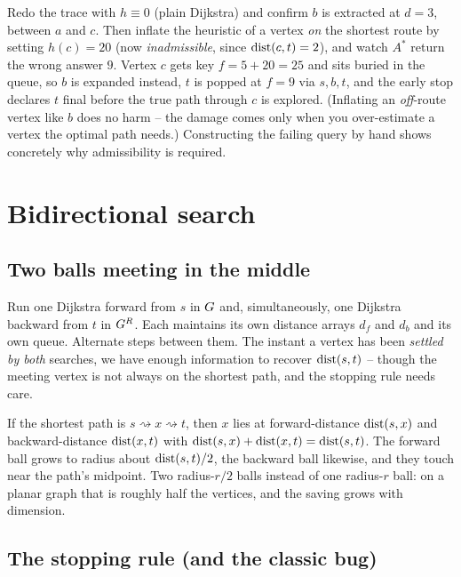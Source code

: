 \begin{labbox}
Redo the trace with $h\equiv 0$ (plain Dijkstra) and confirm $b$ is extracted at
$d=3$, between $a$ and $c$. Then inflate the heuristic of a vertex \emph{on} the
shortest route by setting $h(c)=20$ (now \emph{inadmissible}, since $\operatorname{dist}(c,t)=2$),
and watch $A^*$ return the wrong answer $9$. Vertex $c$ gets key $f=5+20=25$ and
sits buried in the queue, so $b$ is expanded instead, $t$ is popped at $f=9$ via
$s,b,t$, and the early stop declares $t$ final before the true path through $c$ is
explored. (Inflating an \emph{off}-route vertex like $b$ does no harm -- the
damage comes only when you over-estimate a vertex the optimal path needs.)
Constructing the failing query by hand shows concretely why admissibility is
required.
\end{labbox}

\section{Bidirectional search}
\label{ch08:bidir}

\subsection{Two balls meeting in the middle}

Run one Dijkstra forward from $s$ in $G$ and, simultaneously, one Dijkstra
backward from $t$ in $G^{R}$. Each maintains its own distance arrays $d_f$ and
$d_b$ and its own queue. Alternate steps between them. The instant a vertex has
been \emph{settled by both} searches, we have enough information to recover
$\operatorname{dist}(s,t)$ -- though the meeting vertex is not always on the
shortest path, and the stopping rule needs care.

\begin{intuitionbox}
If the shortest path is $s\rightsquigarrow x \rightsquigarrow t$, then $x$ lies
at forward-distance $\operatorname{dist}(s,x)$ and backward-distance $\operatorname{dist}(x,t)$ with
$\operatorname{dist}(s,x)+\operatorname{dist}(x,t)=\operatorname{dist}(s,t)$. The forward ball grows to radius about
$\operatorname{dist}(s,t)/2$, the backward ball likewise, and they touch near the path's
midpoint. Two radius-$r/2$ balls instead of one radius-$r$ ball: on a planar
graph that is roughly half the vertices, and the saving grows with dimension.
\end{intuitionbox}

\subsection{The stopping rule (and the classic bug)}

